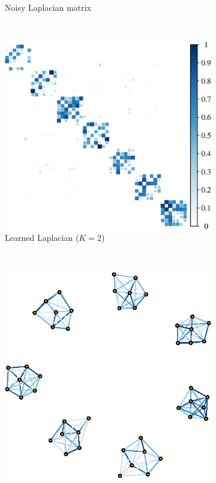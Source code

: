 \begin{figure}[!htb]
\begin{subfigure}[b]{0.3\textwidth}
        \caption{Noisy Laplacian matrix}
    \end{subfigure}
    ~ %
    \begin{subfigure}[b]{0.3\textwidth}
        \includegraphics[width=\textwidth]{model-mismatch/latex/figures/est_mat.eps}
        \caption{Learned Laplacian ($K = 2$)}
    \end{subfigure}
        \\
    \begin{subfigure}[b]{0.3\textwidth}
        \includegraphics[width=\textwidth]{model-mismatch/latex/figures/true_graph.eps}

\end{subfigure}
\end{figure}
